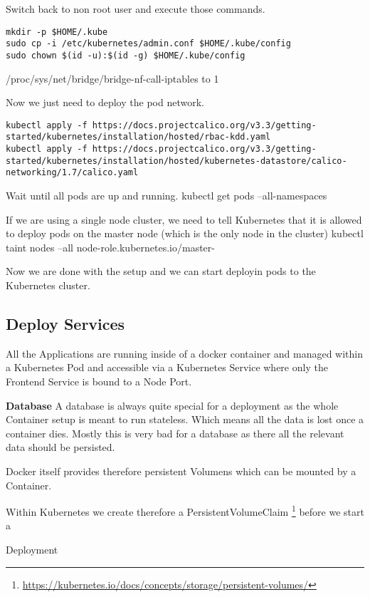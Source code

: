 Switch back to non root user and execute those commands.

\begin{verbatim}
mkdir -p $HOME/.kube
sudo cp -i /etc/kubernetes/admin.conf $HOME/.kube/config
sudo chown $(id -u):$(id -g) $HOME/.kube/config
\end{verbatim}

/proc/sys/net/bridge/bridge-nf-call-iptables to 1

Now we just need to deploy the pod network.
\begin{verbatim}
kubectl apply -f https://docs.projectcalico.org/v3.3/getting-started/kubernetes/installation/hosted/rbac-kdd.yaml
kubectl apply -f https://docs.projectcalico.org/v3.3/getting-started/kubernetes/installation/hosted/kubernetes-datastore/calico-networking/1.7/calico.yaml
\end{verbatim}

Wait until all pods are up and running.
kubectl get pods --all-namespaces

If we are using a single node cluster, we need to tell Kubernetes that it is allowed to deploy pods on the master node (which is the only node in the cluster)
kubectl taint nodes --all node-role.kubernetes.io/master-

Now we are done with the setup and we can start deployin pods to the Kubernetes cluster.

\subsection{Deploy Services}
All the Applications are running inside of a docker container and managed within a Kubernetes Pod and accessible via a Kubernetes Service where only the Frontend Service is bound to a Node Port.

\textbf{Database}
A database is always quite special for a deployment as the whole Container setup is meant to run stateless. Which means all the data is lost once a container dies. Mostly this is very bad for a database as there all the relevant data should be persisted.

Docker itself provides therefore persistent Volumens which can be mounted by a Container.

Within Kubernetes we create therefore a PersistentVolumeClaim \footnote{\url{https://kubernetes.io/docs/concepts/storage/persistent-volumes/}} before we start a 

Deployment



